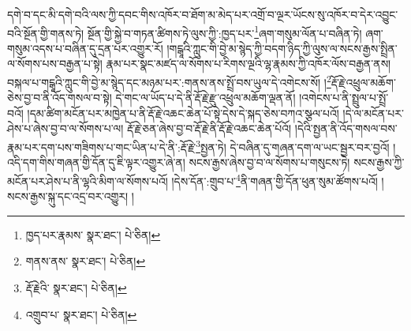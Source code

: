 དགེ་བ་དང་མི་དགེ་བའི་ལས་ཀྱི་དབང་གིས་འཁོར་བ་ཐོག་མ་མེད་པར་འགྲོ་བ་ལྔར་ཡོངས་སུ་འཁོར་བ་དེར་འབྱུང་བའི་སྔོན་གྱི་གནས་ཏེ། སྔོན་གྱི་སྐྱེ་བ་གཏན་ཚིགས་ཏེ་ལུས་ཀྱི་:ཁྱད་པར་\footnote{ཁྱད་པར་རྣམས་  སྣར་ཐང་།  པེ་ཅིན། }ཞག་གསུམ་ལོན་པ་བཞིན་ཏེ། ཞག་གསུམ་འདས་པ་བཞིན་དུ་དྲན་པར་འགྱུར་རོ། །གངྒཱའི་ཀླུང་གི་བྱེ་མ་སྙེད་ཀྱི་བདག་ཉིད་ཀྱི་ལུས་ལ་སངས་རྒྱས་སྤྲིན་ལ་སོགས་པས་བརྒྱན་པ་སྟེ། རྣམ་པར་སྣང་མཛད་ལ་སོགས་པ་རིགས་ལྔའི་ལྷ་རྣམས་ཀྱི་འཁོར་ལོས་བརྒྱན་ནས། བསྐལ་པ་གངྒཱའི་ཀླུང་གི་བྱེ་མ་སྙེད་དང་མཉམ་པར་:གནས་ནས་སྤྲོ་བས་ཡུལ་དེ་འགེངས་སོ། །\footnote{གནས་ནས་  སྣར་ཐང་།  པེ་ཅིན། }རྡོ་རྗེ་འཕྲུལ་མཆོག་ཅེས་བྱ་བ་ནི་འོད་གསལ་བ་སྟེ། དེ་གང་ལ་ཡོད་པ་དེ་ནི་རྡོ་རྗེ་རྫུ་འཕྲུལ་མཆོག་ལྡན་ནོ། །འགེངས་པ་ནི་སྤྲུལ་པ་སྤྲོ་བའོ། །དམ་ཚིག་མངོན་པར་མཁྱེན་པ་ནི་རྡོ་རྗེ་འཆང་ཆེན་པོ་སྟེ་དེས་དེ་སྐད་ཅེས་བཀའ་སྩལ་པའོ། །དེ་ལ་མངོན་པར་ཤེས་པ་ཞེས་བྱ་བ་ལ་སོགས་པ་ལ། རྡོ་རྗེ་ཅན་ཞེས་བྱ་བ་རྡོ་རྗེ་ནི་རྡོ་རྗེ་འཆང་ཆེན་པོའོ། །དེའི་སྤྱན་ནི་འོད་གསལ་བས་རྣམ་པར་དག་པས་གཟིགས་པ་གང་ཡིན་པ་དེ་ནི་:རྡོ་རྗེ་\footnote{རྡོ་རྗེའི་  སྣར་ཐང་།  པེ་ཅིན། }སྤྱན་ཏེ། དེ་བཞིན་དུ་གཞན་དག་ལ་ཡང་སྦྱར་བར་བྱའོ། །འདི་དག་གིས་གཞན་གྱི་དོན་དུ་ཇི་ལྟར་འགྱུར་ཞེ་ན། སངས་རྒྱས་ཞེས་བྱ་བ་ལ་སོགས་པ་གསུངས་ཏེ། སངས་རྒྱས་ཀྱི་མངོན་པར་ཤེས་པ་ནི་ལྷའི་མིག་ལ་སོགས་པའོ། །དེས་དོན་:གྲུབ་པ་\footnote{འགྲུབ་པ་  སྣར་ཐང་།  པེ་ཅིན། }ནི་གཞན་གྱི་དོན་ཕུན་སུམ་ཚོགས་པའོ། །སངས་རྒྱས་སྐུ་དང་འདྲ་བར་འགྱུར། །
